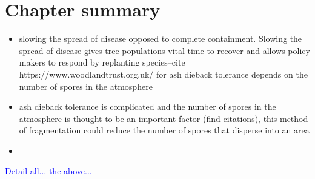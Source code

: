 \section{Chapter summary}

\begin{itemize}
    \item slowing the spread of disease opposed to complete containment. Slowing the spread of disease gives tree populations vital time to recover and allows policy makers to respond by replanting species--cite https://www.woodlandtrust.org.uk/ for ash dieback tolerance depends on the number of spores in the atmosphere
    \item ash dieback tolerance is complicated and the number of spores in the atmosphere is thought to be an important factor (find citations), this method of fragmentation could reduce the number of spores that disperse into an area
    \item 
\end{itemize}
\textcolor{blue}{Detail all... the above...}

